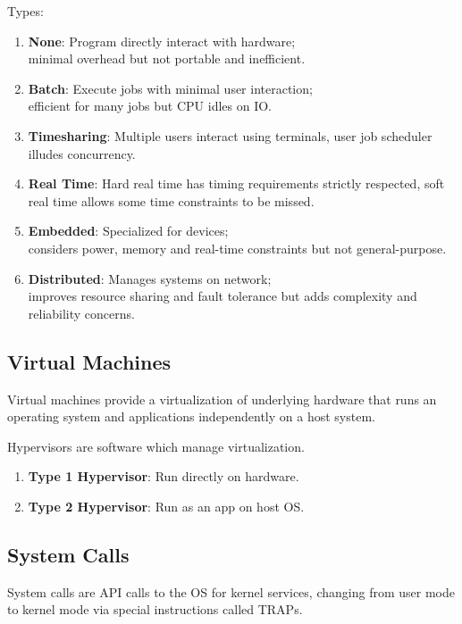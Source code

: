 \documentclass[12pt, a4paper]{article}
\begin{document}
\begin{multicols*}{3}
\colbreak
Types:
\begin{enumerate}[\roman*.]
  \item \textbf{None}: Program directly interact with hardware;\\ minimal overhead but not portable and inefficient.
  \item \textbf{Batch}: Execute jobs with minimal user interaction;\\efficient for many jobs but CPU idles on IO.
  \item \textbf{Timesharing}: Multiple users interact using terminals, user job scheduler illudes concurrency. 
  \item \textbf{Real Time}: Hard real time has timing requirements strictly respected, soft real time allows some time constraints to be missed.
  \item \textbf{Embedded}: Specialized for devices;\\considers power, memory and real-time constraints but not general-purpose.
  \item \textbf{Distributed}: Manages systems on network;\\improves resource sharing and fault tolerance but adds complexity and reliability concerns.
\end{enumerate}

\subsection{Virtual Machines}
Virtual machines provide a virtualization of underlying hardware that runs an operating system and applications independently on a host system. 

Hypervisors are software which manage virtualization.
\begin{enumerate}[\roman*.]
  \item \textbf{Type 1 Hypervisor}: Run directly on hardware.
    \begin{center}
    \end{center}
  \item \textbf{Type 2 Hypervisor}: Run as an app on host OS.
    \begin{center}
    \end{center}
\end{enumerate}

\colbreak
\subsection{System Calls}
System calls are API calls to the OS for kernel services, changing from user mode to kernel mode via special instructions called TRAPs.


\end{multicols*}
\end{document}
